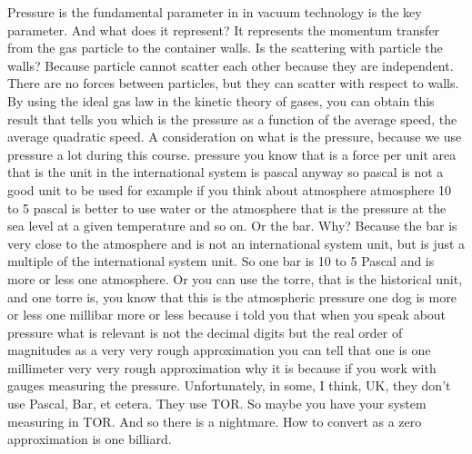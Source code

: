 Pressure is the fundamental parameter in in vacuum technology is the key parameter. And what does it represent? It represents the momentum transfer from the gas particle to the container walls. Is the scattering with particle the walls? Because particle cannot scatter each other because they are independent. There are no forces between particles, but they can scatter with respect to walls. By using the ideal gas law in the kinetic theory of gases, you can obtain this result that tells you which is the pressure as a function of the average speed, the average quadratic speed. A consideration on what is the pressure, because we use pressure a lot during this course. pressure you know that is a force per unit area that is the unit in the international system is pascal anyway so pascal is not a good unit to be used for example if you think about atmosphere atmosphere 10 to 5 pascal is better to use water or the atmosphere that is the pressure at the sea level at a given temperature and so on. Or the bar. Why? Because the bar is very close to the atmosphere and is not an international system unit, but is just a multiple of the international system unit. So one bar is 10 to 5 Pascal and is more or less one atmosphere. Or you can use the torre, that is the historical unit, and one torre is, you know that this is the atmospheric pressure one dog is more or less one millibar more or less because i told you that when you speak about pressure what is relevant is not the decimal digits but the real order of magnitudes as a very very rough approximation you can tell that one is one millimeter very very rough approximation why it is because if you work with gauges measuring the pressure. Unfortunately, in some, I think, UK, they don't use Pascal, Bar, et cetera. They use TOR. So maybe you have your system measuring in TOR. And so there is a nightmare. How to convert as a zero approximation is one billiard.
